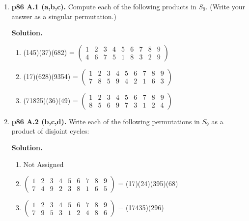 \documentclass[11pt]{article}
\begin{document}
\begin{enumerate}
\begin{proof}
	\end{proof}
  
\newpage

\item {\bfseries p86 A.1 (a,b,c).} Compute each of the following products in $S_9$. (Write your answer as a singular permutation.)
  
	{\bfseries Solution.}
	
	\begin{enumerate}
  
		\item (145)(37)(682) =
		$\begin{pmatrix}
			1 & 2 & 3 & 4 & 5 & 6 & 7 & 8 & 9 \\
			4 & 6 & 7 & 5 & 1 & 8 & 3 & 2 & 9
		\end{pmatrix}$
		
		\item (17)(628)(9354) =
		$\begin{pmatrix}
			1 & 2 & 3 & 4 & 5 & 6 & 7 & 8 & 9 \\
			7 & 8 & 5 & 9 & 4 & 2 & 1 & 6 & 3
		\end{pmatrix}$
		
		\item (71825)(36)(49) =
		$\begin{pmatrix}
			1 & 2 & 3 & 4 & 5 & 6 & 7 & 8 & 9 \\
			8 & 5 & 6 & 9 & 7 & 3 & 1 & 2 & 4
		\end{pmatrix}$
  
  \end{enumerate}

\item {\bfseries p86 A.2 (b,c,d).} Write each of the following permutations in $S_9$ as a product of disjoint cycles:
  
	{\bfseries Solution.}
	
	\begin{enumerate}
	
		\item Not Assigned
	
		\item 
		$\begin{pmatrix}
			1 & 2 & 3 & 4 & 5 & 6 & 7 & 8 & 9 \\
			7 & 4 & 9 & 2 & 3 & 8 & 1 & 6 & 5
		\end{pmatrix}$
		= (17)(24)(395)(68)
		
		\item 
		$\begin{pmatrix}
			1 & 2 & 3 & 4 & 5 & 6 & 7 & 8 & 9 \\
			7 & 9 & 5 & 3 & 1 & 2 & 4 & 8 & 6
		\end{pmatrix}$
		= (17435)(296)
		

\end{enumerate}
\end{enumerate}
\end{document}
